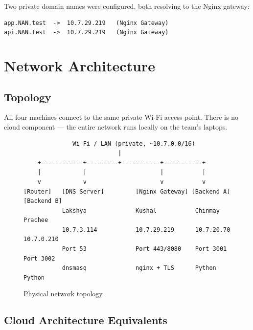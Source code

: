 \documentclass[12pt,a4paper]{article}
\begin{document}
Two private domain names were configured, both resolving to the Nginx gateway:

\begin{lstlisting}
app.NAN.test  ->  10.7.29.219   (Nginx Gateway)
api.NAN.test  ->  10.7.29.219   (Nginx Gateway)
\end{lstlisting}

\section{Network Architecture}

\subsection{Topology}

All four machines connect to the same private Wi-Fi access point. There is no cloud component --- the entire network runs locally on the team's laptops.

\begin{figure}[h!]
\centering
\begin{mdframed}[backgroundcolor=codebg,linecolor=borderblue]
\begin{verbatim}
              Wi-Fi / LAN (private, ~10.7.0.0/16)
                           |
    +------------+---------+-----------+-----------+
    |            |                     |           |
    v            v                     v           v
[Router]   [DNS Server]         [Nginx Gateway] [Backend A] [Backend B]
           Lakshya              Kushal           Chinmay     Prachee
           10.7.3.114           10.7.29.219      10.7.20.70  10.7.0.210
           Port 53              Port 443/8080    Port 3001   Port 3002
           dnsmasq              nginx + TLS      Python      Python
\end{verbatim}
\end{mdframed}
\caption{Physical network topology}
\end{figure}

\subsection{Cloud Architecture Equivalents}
\end{document}
